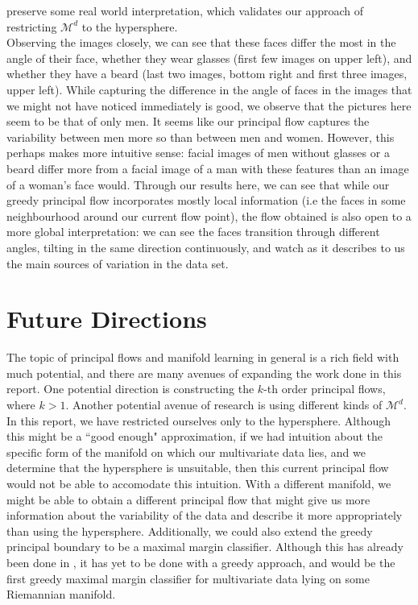 \documentclass[12pt]{report}
\begin{document}
preserve some real world interpretation, which validates our approach
of restricting $\mathcal{M}^d$ to the hypersphere. 
\\
Observing the images closely, we can see that 
these faces differ the most in the angle of their face,
whether they wear glasses (first few images on upper left), 
and whether they have a beard (last two images, 
bottom right and first three images, upper left).
While capturing the difference in the angle of faces in the images 
that we might not have noticed immediately is good, 
we observe that the pictures here seem to be that of only men. 
It seems like our principal flow captures the 
variability between men more so than between men and women.
However, this perhaps makes more intuitive sense:
facial images of men without glasses or a beard differ 
more from a facial image of a man with these features than
an image of a woman's face would.
Through our results here, we can see that while our greedy principal flow
incorporates mostly local information (i.e the faces in some neighbourhood around 
our current flow point), the flow obtained is also open to a more global interpretation: 
we can see the faces transition through different angles, 
tilting in the same direction continuously, 
and watch as it describes to us the main sources of variation in the data set. 

\chapter{Future Directions}

The topic of principal flows and manifold learning in general is a rich field 
with much potential, and there are many avenues of 
expanding the work done in this report. 
One potential direction is constructing the $k$-th order principal flows, where $k>1$. 
Another potential avenue of research is using different kinds of $\mathcal{M}^d$. 
In this report, we have restricted ourselves only to the hypersphere. Although this 
might be a ``good enough" approximation, if we had intuition about the specific form 
of the manifold on which our multivariate data lies, and we determine that the 
hypersphere is unsuitable, then this current principal flow would not be able to 
accomodate this intuition. With a different manifold, we might be able to obtain 
a different principal flow that might give us more information about the 
variability of the data and describe it more appropriately than using the hypersphere. 
Additionally, we could also extend the greedy principal boundary to be a maximal margin
classifier. Although this has already been done in \cite{principalboundary}, 
it has yet to be done with a greedy approach, and would be the first
greedy maximal margin classifier for multivariate data lying on some 
Riemannian manifold.
\end{document}
